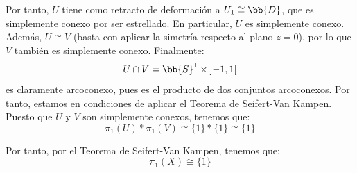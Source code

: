 \begin{ejercicio}
\begin{enumerate}[label=\alph*)]
\begin{description}
                Por tanto, $U$ tiene como retracto de deformación a $U_1\cong \bb{D}$, que es simplemente conexo por ser estrellado. En particular, $U$ es simplemente conexo. Además, $U\cong V$ (basta con aplicar la simetría respecto al plano $z=0$), por lo que $V$ también es simplemente conexo. Finalmente:
                \begin{equation*}
                    U\cap V = \bb{S}^1\times \left]-1,1\right[
                \end{equation*}
                es claramente arcoconexo, pues es el producto de dos conjuntos arcoconexos. Por tanto, estamos en condiciones de aplicar el Teorema de Seifert-Van Kampen. Puesto que $U$ y $V$ son simplemente conexos, tenemos que:
                \begin{equation*}
                    \pi_1(U)\ast \pi_1(V) \cong \{1\}\ast \{1\} \cong \{1\}
                \end{equation*}

                Por tanto, por el Teorema de Seifert-Van Kampen, tenemos que:
                \begin{equation*}
                    \pi_1(X) \cong \{1\}
                \end{equation*}


\end{description}
\end{enumerate}
\end{ejercicio}
